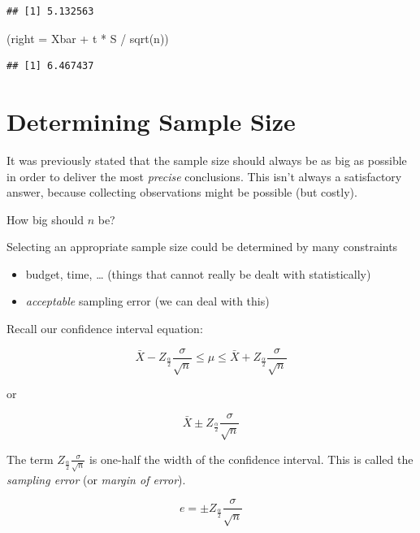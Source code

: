 \documentclass[
]{book}
\newenvironment{Shaded}{\begin{snugshade}}{\end{snugshade}}
\newcommand{\AttributeTok}[1]{\textcolor[rgb]{0.77,0.63,0.00}{#1}}
\newcommand{\FunctionTok}[1]{\textcolor[rgb]{0.00,0.00,0.00}{#1}}
\newcommand{\NormalTok}[1]{#1}
\newcommand{\SpecialCharTok}[1]{\textcolor[rgb]{0.00,0.00,0.00}{#1}}
\begin{document}
\begin{verbatim}
## [1] 5.132563
\end{verbatim}

\begin{Shaded}
\begin{Highlighting}[]
\NormalTok{(}\AttributeTok{right =}\NormalTok{ Xbar }\SpecialCharTok{+}\NormalTok{ t }\SpecialCharTok{*}\NormalTok{ S }\SpecialCharTok{/} \FunctionTok{sqrt}\NormalTok{(n))}
\end{Highlighting}
\end{Shaded}

\begin{verbatim}
## [1] 6.467437
\end{verbatim}

\hypertarget{determining-sample-size}{%
\section{Determining Sample Size}\label{determining-sample-size}}

It was previously stated that the sample size should always be as big as possible in order to deliver the most \emph{precise} conclusions. This isn't always a satisfactory answer, because collecting observations might be possible (but costly).

How big should \(n\) be?

Selecting an appropriate sample size could be determined by many constraints

\begin{itemize}
\item
  budget, time, \ldots{} (things that cannot really be dealt with statistically)
\item
  \emph{acceptable} sampling error (we can deal with this)
\end{itemize}

Recall our confidence interval equation:

\[\bar{X}-Z_{\frac{\alpha}{2}}\frac{\sigma}{\sqrt{n}} \leq \mu \leq \bar{X}+Z_{\frac{\alpha}{2}}\frac{\sigma}{\sqrt{n}}\]

or

\[\bar{X} \pm Z_{\frac{\alpha}{2}}\frac{\sigma}{\sqrt{n}}\]

The term \(Z_{\frac{\alpha}{2}}\frac{\sigma}{\sqrt{n}}\) is one-half the width of the confidence interval. This is called the \emph{sampling error} (or \emph{margin of error}).

\[e = \pm Z_{\frac{\alpha}{2}}\frac{\sigma}{\sqrt{n}}\]
\end{document}
